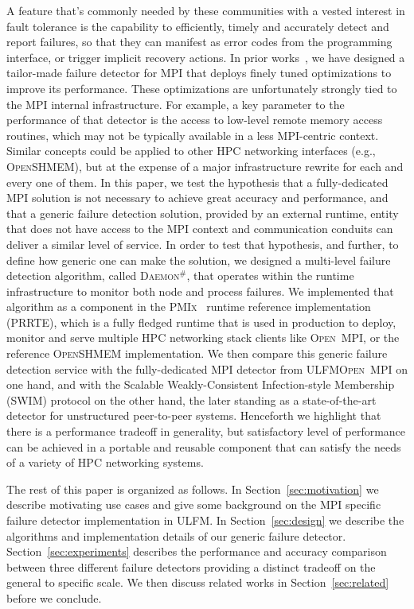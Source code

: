 \documentclass[sigconf]{acmart}
\newcommand{\prrte}[0]{\textsc{PRRTE}\xspace}
\newcommand{\pmix}[0]{\textsc{PMIx}\xspace}
\newcommand{\ompi}[0]{\textsc{Open~MPI}\xspace}
\newcommand{\ulfm}[0]{\textsc{ULFM}\xspace}
\newcommand{\mpi}[0]{\textsc{MPI}\xspace}
\newcommand{\oshmem}[0]{\textsc{OpenSHMEM}\xspace}
\newcommand{\ourwork}[0]{\textsc{Daemon}\ensuremath{^\#}\xspace}
\begin{document}
A feature that's commonly needed by these communities with a vested
interest in fault tolerance is the capability to efficiently, timely and
accurately detect and report failures, so that they can manifest as
error codes from the programming interface, or trigger implicit recovery
actions. In prior works~\cite{George16}, we have designed a tailor-made
failure detector for \mpi that deploys finely tuned optimizations to
improve its performance. These optimizations are unfortunately strongly
tied to the \mpi internal infrastructure. For example, a key parameter to 
the performance of that detector is the
access to low-level remote memory access routines, which may not be typically
available in a less \mpi-centric context. Similar concepts could be
applied to other HPC networking interfaces (e.g., \oshmem), but at 
the expense of a major infrastructure rewrite for each and every one of 
them. In this paper, we test the hypothesis that a fully-dedicated \mpi 
solution is not necessary to achieve great accuracy and performance, and 
that a generic failure detection solution, provided by an external runtime, 
entity that does not have access to the \mpi context and communication conduits
can deliver a similar level of service. In order to test that hypothesis, 
and further, to define how generic one can make the solution, we designed 
a multi-level failure detection algorithm, called \ourwork, that operates
within the runtime infrastructure to monitor both node and process 
failures. We implemented that algorithm as a component in the \pmix~\cite{CASTAIN18} runtime reference implementation (\prrte), which is a fully fledged runtime that is 
used in production to deploy, monitor and 
serve multiple HPC networking stack clients like \ompi, or the 
reference \oshmem implementation. We then compare this generic 
failure detection service with the fully-dedicated \mpi detector from 
\ulfm \ompi on one hand, and with the Scalable Weakly-Consistent Infection-style Membership (SWIM) protocol on the other hand, the later standing
as a state-of-the-art detector for unstructured peer-to-peer systems. Henceforth 
we highlight that there is a performance tradeoff in generality, but 
satisfactory level of performance can be achieved in a portable and reusable 
component that can satisfy the needs of a variety of HPC networking systems. 

The rest of this paper is organized as follows. In Section~\ref{sec:motivation}
we describe motivating use cases and give some background on the \mpi specific 
failure detector implementation in \ulfm. In Section~\ref{sec:design} we describe 
the algorithms and implementation details of our generic failure detector.
Section~\ref{sec:experiments} describes the performance and accuracy comparison
between three different failure detectors providing a distinct tradeoff 
on the general to specific scale. We then discuss related works  in 
Section~\ref{sec:related} before we conclude.
\end{document}
